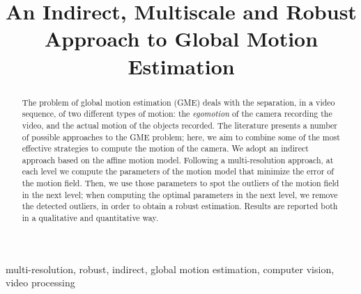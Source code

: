 \documentclass[conference]{IEEEtran}
\begin{document}
\title{An Indirect, Multiscale and Robust Approach to Global Motion Estimation}

\author{
\and
{}
}

\maketitle

\thispagestyle{plain}
\pagestyle{plain}

\begin{abstract}
The problem of global motion estimation (GME) deals with the separation, in a video sequence, of two different types of motion: the \emph{egomotion} of the camera recording the video, and the actual motion of the objects recorded. The literature presents a number of possible approaches to the GME problem; here, we aim to combine some of the most effective strategies to compute the motion of the camera. We adopt an indirect approach based on the affine motion model. Following a multi-resolution approach, at each level we compute the parameters of the motion model that minimize the error of the motion field. Then, we use those parameters to spot the outliers of the motion field in the next level; when computing the optimal parameters in the next level, we remove the detected outliers, in order to obtain a robust estimation.
Results are reported both in a qualitative and quantitative way.  
\end{abstract}

\begin{IEEEkeywords}
multi-resolution, robust, indirect, global motion estimation, computer vision, video processing
\end{IEEEkeywords}







{}

\end{document}
